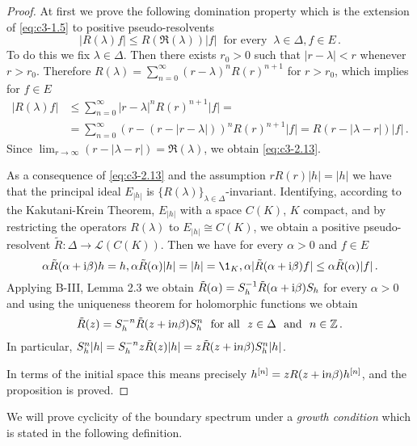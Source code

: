 \begin{proof}
At first we prove the following domination property which is the extension of \eqref{eq:c3-1.5} to positive pseudo-resolvents
\begin{equation}\label{eq:c3-2.13}
	|R(\lambda)f| \leq R(\Re(\lambda)) |f| \ \text{ for every } \ \lambda \in \Delta , f \in E\,.
\end{equation}
To do this we fix $\lambda \in \Delta$.
Then there exists $r_{0} > 0$ such that $|r-\lambda| < r$ whenever $r > r_{0}$.
Therefore $R(\lambda) = \sum_{n=0}^{\infty}(r-\lambda)^{n}R(r)^{n+1}$ for $r > r_{0}$, which implies for $f \in E$
\begin{align*}
	|R(\lambda)f| &\leq \sum_{n=0}^{\infty}|r-\lambda|^{n}R(r)^{n+1}|f| = \\
	& =\sum_{n=0}^{\infty}(r - (r-|r-\lambda|))^{n}R(r)^{n+1}|f| = R(r - |\lambda-r|) |f|\,.
\end{align*}
Since $\lim_{r \to \infty} (r - |\lambda-r|) = \Re(\lambda)$, we obtain \eqref{eq:c3-2.13}.

As a consequence of \eqref{eq:c3-2.13} and the assumption $rR(r) |h| = |h|$ we have that the principal ideal $E_{|h|}$ is $\{R(\lambda)\}_{\lambda \in \Delta}$-invariant.
Identifying, according to the Kakutani-Krein Theorem, $E_{|h|}$ with a space $C(K)$, $K$ compact, and by restricting the operators $R(\lambda)$ to $E_{|h|} \cong C(K)$, we obtain a positive pseudo-resolvent $\tilde{R} \colon \Delta \to \mathcal{L}(C(K))$.
Then we have for every $\alpha > 0$ and $f \in E$
\[
\alpha\tilde{R}(\alpha+\im\beta)h = h, \alpha\tilde{R}(\alpha) |h| = |h| = \1_{K}, \alpha|\tilde{R}(\alpha+\im\beta)f| \leq \alpha\tilde{R}(\alpha) |f|\,.
\]
Applying B-III, Lemma 2.3 we obtain $\tilde{R}(\alpha) = S_{h}^{-1}\tilde{R}(\alpha + \mathrm{i}\beta)S_{h}$ for every $\alpha > 0$ and using the uniqueness theorem for holomorphic functions we obtain
\begin{equation}\label{eq:c3-2.14}
\tilde{R}(z) = S_{h}^{-n}\tilde{R}(z + \mathrm{i} n\beta)S_{h}^{n} \ \text{ for all } \ z \in \Delta \ \text{ and } \ n \in \mathbb{Z}\,.
\end{equation}
In particular, $S_{h}^{n}|h| = S_{h}^{-n}z\tilde{R}(z) |h| = z\tilde{R}(z+\mathrm{i} n\beta)S_{h}^{n}|h|$.

In terms of the initial space this means precisely $h^{[n]} = zR(z+\mathrm{i} n\beta)h^{[n]}$, and the proposition is proved.
\end{proof}
We will prove cyclicity of the boundary spectrum under a \emph{growth condition} which is stated in the following definition.

